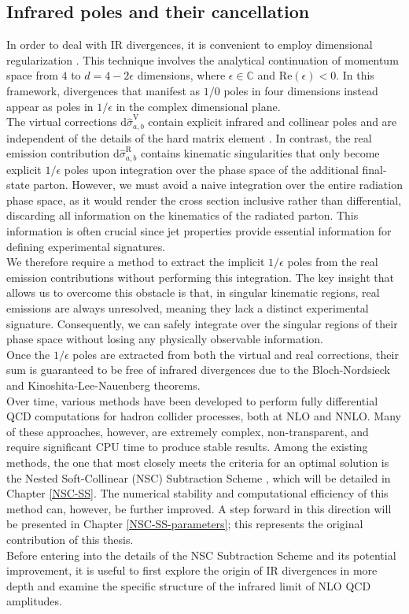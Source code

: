 \documentclass[a4paper, 12pt]{book}
\begin{document}
\subsection{Infrared poles and their cancellation}
In order to deal with IR divergences, it is convenient to employ dimensional regularization \cite{THOOFT1973455}. This technique involves the analytical continuation of momentum space from $4$ to $d=4-2\epsilon$ dimensions, where $\epsilon \in \mathbb{C}$ and $\mathrm{Re}(\epsilon)<0$. In this framework, divergences that manifest as $1/0$ poles in four dimensions instead appear as poles in $1/\epsilon$ in the complex dimensional plane. \\
The virtual corrections $\mathrm{d} \hat{\sigma}_{a,b}^{\mathrm{V}}$ contain explicit infrared and collinear poles and are independent of the details of the hard matrix element \cite{Catani:1996vz}. In contrast, the real emission contribution $\mathrm{d} \hat{\sigma}_{a,b}^{\mathrm{R}}$ contains kinematic singularities that only become explicit $1/\epsilon$ poles upon integration over the phase space of the additional final-state parton. However, we must avoid a naive integration over the entire radiation phase space, as it would render the cross section inclusive rather than differential, discarding all information on the kinematics of the radiated parton. This information is often crucial since jet properties provide essential information for defining experimental signatures. \\
We therefore require a method to extract the implicit $1/\epsilon$ poles from the real emission contributions without performing this integration. The key insight that allows us to overcome this obstacle is that, in singular kinematic regions, real emissions are always unresolved, meaning they lack a distinct experimental signature. Consequently, we can safely integrate over the singular regions of their phase space without losing any physically observable information. \\
Once the $1/\epsilon$ poles are extracted from both the virtual and real corrections, their sum is guaranteed to be free of infrared divergences due to the Bloch-Nordsieck \cite{PhysRev.52.54} and Kinoshita-Lee-Nauenberg theorems.\\
Over time, various methods have been developed to perform fully differential QCD computations for hadron collider processes, both at NLO and NNLO. Many of these approaches, however, are extremely complex, non-transparent, and require significant CPU time to produce stable results. Among the existing methods, the one that most closely meets the criteria for an optimal solution is the Nested Soft-Collinear (NSC) Subtraction Scheme \cite{Caola:2017dug}, which will be detailed in Chapter \ref{NSC-SS}. The numerical stability and computational efficiency of this method can, however, be further improved. A step forward in this direction will be presented in Chapter \ref{NSC-SS-parameters}; this represents the original contribution of this thesis. \\
Before entering into the details of the NSC Subtraction Scheme and its potential improvement, it is useful to first explore the origin of IR divergences in more depth and examine the specific structure of the infrared limit of NLO QCD amplitudes. 
\end{document}
